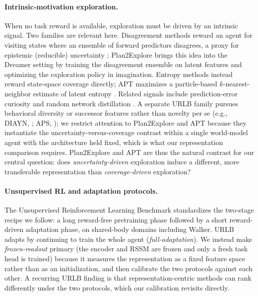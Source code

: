 \documentclass{article}
\begin{document}
\paragraph{Intrinsic-motivation exploration.}
When no task reward is available, exploration must be driven by an intrinsic
signal. Two families are relevant here. Disagreement methods reward an agent for
visiting states where an ensemble of forward predictors disagrees, a proxy for
epistemic (reducible) uncertainty \citep{pathak2019disagreement}; Plan2Explore
\citep{sekar2020plan2explore} brings this idea into the Dreamer setting by
training the disagreement ensemble on latent features and optimizing the
exploration policy in imagination. Entropy methods instead reward state-space
coverage directly; APT \citep{liu2021apt} maximizes a particle-based
$k$-nearest-neighbor estimate of latent entropy \citep{singh2003knn}.
Related signals include prediction-error curiosity \citep{pathak2017icm} and
random network distillation \citep{burda2019rnd}. A separate URLB family pursues
behavioral diversity or successor features rather than novelty per se (e.g.,
DIAYN, \citealp{eysenbach2019diayn}; APS, \citealp{liu2021aps}); we restrict
attention to Plan2Explore and APT because they instantiate the
uncertainty-versus-coverage contrast within a single world-model agent
with the architecture held fixed, which is what our representation comparison
requires. Plan2Explore and APT are thus the natural contrast for our central
question: does \emph{uncertainty-driven} exploration induce a different, more
transferable representation than \emph{coverage-driven} exploration?

\paragraph{Unsupervised RL and adaptation protocols.}
The Unsupervised Reinforcement Learning Benchmark \citep{laskin2021urlb}
standardizes the two-stage recipe we follow: a long reward-free pretraining
phase followed by a short reward-driven adaptation phase, on shared-body domains
including Walker. URLB adapts by continuing to train the whole agent
(\emph{full-adaptation}). We instead make \emph{frozen-readout} primary (the
encoder and RSSM are frozen and only a fresh task head is trained) because it
measures the representation as a fixed feature space rather than as an
initialization, and then calibrate the two protocols against each other. A
recurring URLB finding is that representation-centric methods can rank
differently under the two protocols, which our calibration revisits directly.
\end{document}
